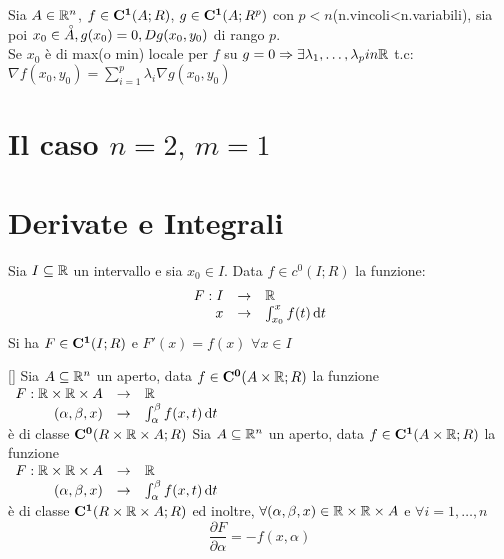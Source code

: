Sia $A\in \mathbb{R}^n$, $f\in \mathbf{C^{1}}(A;R)$, $g\in \mathbf{C^{1}}(A;R^p)$ con $p<n$(n.vincoli<n.variabili), sia poi $x_0\in\accentset{\circ}{A}, g(x_0)=0, Dg (x_0,y_0)$ di rango $p$.\\
Se $x_0$ è di max(o min) locale per $f$ su $g=0\Rightarrow\exists \lambda_1,\ldots,\lambda_p in \mathbb{R}$ t.c: $\nabla f(x_0,y_0) = \sum\limits_{i=1}^{p}\lambda_i\nabla g(x_0,y_0)$\\
\section{Il caso $n=2,\,m=1$}
\section{Derivate e Integrali}
\begin{proposition}
	\label{teo:fondament_calcolo_integ}
	Sia $I\subseteq \mathbb{R}$ un intervallo e sia $x_0\in I$. Data $f\in c^0(I;R)$ la funzione:
	$$\begin{array}{rcl} F: I & \to & \mathbb{R} \\ x & \to & \int_{x_0}^{x}f(t)\,\mathrm{d}{t} \end{array}$$
	Si ha $F\in \mathbf{C^{1}}(I;R)$ e $F'(x)=f(x)$ $\forall x \in I$
\end{proposition}[]
\proposition
Sia $A\subseteq \mathbb{R}^n$ un aperto, data $f\in \mathbf{C^{0}}(A\times \mathbb{R};R)$ la funzione \\
$\begin{array}{rcl} F: \mathbb{R}\times \mathbb{R}\times A & \to & \mathbb{R} \\ (\alpha,\beta,x) & \to & \int_{\alpha}^{\beta}f(x,t)\,\mathrm{d}{t} \end{array}$\\
è di classe $\mathbf{C^{0}}(R\times \mathbb{R}\times A;R)$
\proposition
Sia $A\subseteq \mathbb{R}^n$ un aperto, data $f\in \mathbf{C^{1}}(A\times \mathbb{R};R)$ la funzione \\
$\begin{array}{rcl} F: \mathbb{R}\times \mathbb{R}\times A & \to & \mathbb{R} \\ (\alpha,\beta,x) & \to & \int_{\alpha}^{\beta}f(x,t)\,\mathrm{d}{t} \end{array}$\\
è di classe $\mathbf{C^{1}}(R\times \mathbb{R}\times A;R)$ ed inoltre, $\forall (\alpha,\beta,x)\in \mathbb{R}\times \mathbb{R}\times A$ e $\forall i=1,\ldots,n$\\
$$\frac{\partial F}{\partial \alpha}=-f(x,\alpha)$$
